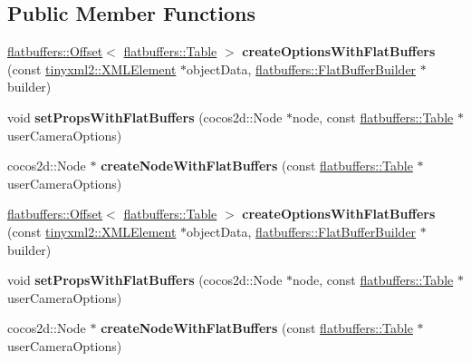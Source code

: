 \subsection*{Public Member Functions}
\begin{DoxyCompactItemize}
\item 
\mbox{\label{classcocostudio_1_1UserCameraReader_ad35ed10399c4385a18341c1217143902}} 
\hyperlink{structflatbuffers_1_1Offset}{flatbuffers\+::\+Offset}$<$ \hyperlink{classflatbuffers_1_1Table}{flatbuffers\+::\+Table} $>$ {\bfseries create\+Options\+With\+Flat\+Buffers} (const \hyperlink{classtinyxml2_1_1XMLElement}{tinyxml2\+::\+X\+M\+L\+Element} $\ast$object\+Data, \hyperlink{classflatbuffers_1_1FlatBufferBuilder}{flatbuffers\+::\+Flat\+Buffer\+Builder} $\ast$builder)
\item 
\mbox{\label{classcocostudio_1_1UserCameraReader_a883eb9ec86f7c7f59dbd0e54a31fdd8b}} 
void {\bfseries set\+Props\+With\+Flat\+Buffers} (cocos2d\+::\+Node $\ast$node, const \hyperlink{classflatbuffers_1_1Table}{flatbuffers\+::\+Table} $\ast$user\+Camera\+Options)
\item 
\mbox{\label{classcocostudio_1_1UserCameraReader_a75679b1f5c04da99f4b2d4a88b9f6c61}} 
cocos2d\+::\+Node $\ast$ {\bfseries create\+Node\+With\+Flat\+Buffers} (const \hyperlink{classflatbuffers_1_1Table}{flatbuffers\+::\+Table} $\ast$user\+Camera\+Options)
\item 
\mbox{\label{classcocostudio_1_1UserCameraReader_a179991bbc65534b831c3551a3958f699}} 
\hyperlink{structflatbuffers_1_1Offset}{flatbuffers\+::\+Offset}$<$ \hyperlink{classflatbuffers_1_1Table}{flatbuffers\+::\+Table} $>$ {\bfseries create\+Options\+With\+Flat\+Buffers} (const \hyperlink{classtinyxml2_1_1XMLElement}{tinyxml2\+::\+X\+M\+L\+Element} $\ast$object\+Data, \hyperlink{classflatbuffers_1_1FlatBufferBuilder}{flatbuffers\+::\+Flat\+Buffer\+Builder} $\ast$builder)
\item 
\mbox{\label{classcocostudio_1_1UserCameraReader_a883eb9ec86f7c7f59dbd0e54a31fdd8b}} 
void {\bfseries set\+Props\+With\+Flat\+Buffers} (cocos2d\+::\+Node $\ast$node, const \hyperlink{classflatbuffers_1_1Table}{flatbuffers\+::\+Table} $\ast$user\+Camera\+Options)
\item 
\mbox{\label{classcocostudio_1_1UserCameraReader_a62e42ce9bcef93b89b7be533f81291f2}} 
cocos2d\+::\+Node $\ast$ {\bfseries create\+Node\+With\+Flat\+Buffers} (const \hyperlink{classflatbuffers_1_1Table}{flatbuffers\+::\+Table} $\ast$user\+Camera\+Options)
\end{DoxyCompactItemize}
